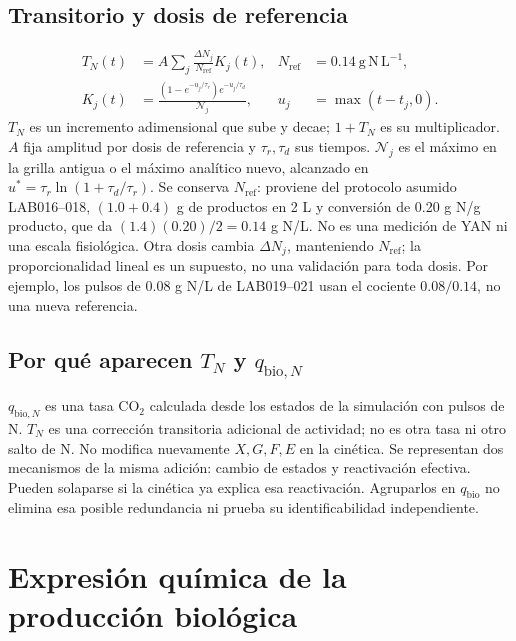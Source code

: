 \documentclass[10pt,a4paper]{article}
\newcommand{\qb}{q_{\mathrm{bio}}}
\begin{document}
\subsection*{Transitorio y dosis de referencia}
\begin{align}
T_N(t)&=A\sum_j\frac{\Delta N_j}{N_{\mathrm{ref}}}K_j(t),&
N_{\mathrm{ref}}&=0.14\ \mathrm{g\,N\,L^{-1}},\label{eq:T}\\
K_j(t)&=\frac{(1-e^{-u_j/\tau_r})e^{-u_j/\tau_d}}{\mathcal N_j},&
u_j&=\max(t-t_j,0).\label{eq:kernel}
\end{align}
$T_N$ es un incremento adimensional que sube y decae; $1+T_N$ es su
multiplicador. $A$ fija amplitud por dosis de referencia y $\tau_r,\tau_d$
sus tiempos. $\mathcal N_j$ es el máximo en la grilla antigua o el máximo
analítico nuevo, alcanzado en $u^*=\tau_r\ln(1+\tau_d/\tau_r)$.
Se conserva $N_{\mathrm{ref}}$: proviene del protocolo asumido LAB016--018,
$(1.0+0.4)$ g de productos en 2 L y conversión de 0.20 g N/g producto,
que da $(1.4)(0.20)/2=0.14$ g N/L. No es una medición de YAN ni una escala
fisiológica. Otra dosis cambia $\Delta N_j$, manteniendo $N_{\mathrm{ref}}$;
la proporcionalidad lineal es un supuesto, no una validación para toda dosis.
Por ejemplo, los pulsos de 0.08 g N/L de LAB019--021 usan el cociente
$0.08/0.14$, no una nueva referencia.

\subsection*{Por qué aparecen $T_N$ y $q_{\mathrm{bio},N}$}
$q_{\mathrm{bio},N}$ es una tasa CO\(_2\) calculada desde los estados de la
simulación con pulsos de N. $T_N$ es una corrección transitoria adicional de
actividad; no es otra tasa ni otro salto de N. No modifica nuevamente
$X,G,F,E$ en la cinética. Se representan dos mecanismos de la misma adición:
cambio de estados y reactivación efectiva. Pueden solaparse si la cinética ya
explica esa reactivación. Agruparlos en $\qb$ no elimina esa posible
redundancia ni prueba su identificabilidad independiente.

\clearpage
\section{Expresión química de la producción biológica}
\end{document}
